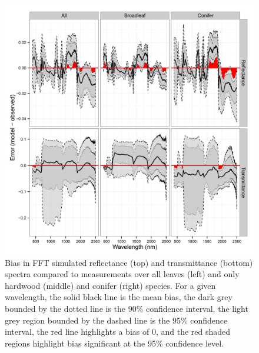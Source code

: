 \begin{figure}
  \centering
  \includegraphics[width=\textwidth]{2_rtm_inversion/figures/spec_validation.pdf}
  \caption{%
    Bias in FFT simulated reflectance (top) and transmittance (bottom) spectra compared to measurements over all leaves (left) and only hardwood (middle) and conifer (right) species. 
    For a given wavelength,
    the solid black line is the mean bias,
    the dark grey bounded by the dotted line is the 90\% confidence interval,
    the light grey region bounded by the dashed line is the 95\% confidence interval,
    the red line highlights a bias of 0,
    and the red shaded regions highlight bias significant at the 95\% confidence level.
  }\label{fig:pecanrtm-specvalidation}
\end{figure}


